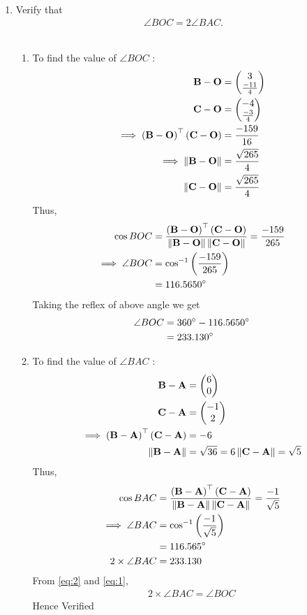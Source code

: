 \documentclass[11pt]{book}
\begin{document}
\begin{enumerate}[label=\thesection.\arabic*.,ref=\thesection.\theenumi]
\item Verify that 
\begin{align}
\angle BOC = 2\angle BAC.
\end{align}\\
 \solution
\begin{enumerate}
\item To find  the value of $\angle{BOC}$ :
\begin{align}
\mathbf{B}-\mathbf{O}
          &=\begin{pmatrix}3\\\frac{-11}{4}\end{pmatrix} \\
\mathbf{C}-\mathbf{O}
         & =\begin{pmatrix}-4\\\frac{-3}{4}\end{pmatrix}
	  \\
\implies \left(\mathbf{B}-\mathbf{O}\right)^{\top}\left(\mathbf{C}-\mathbf{O}\right)&=\frac{-159}{16}\\
	\implies \left\lVert\mathbf{B}-\mathbf{O}\right\rVert&= \frac{\sqrt{265}}{4} \\
	\left\lVert\mathbf{C}-\mathbf{O}\right\rVert &= \frac{\sqrt{265}}{4}
\end{align}
Thus,
\begin{align}
\cos{BOC}&=\frac{\left(\mathbf{B}-\mathbf{O}\right)^{\top}\left(\mathbf{C}-\mathbf{O}\right)}{\left\lVert\mathbf{B}-\mathbf{O}\right\rVert\left\lVert\mathbf{C}-\mathbf{O}\right\rVert}
=\frac{-159}{265}\\
\implies\angle{BOC}&=\cos^{-1}\left(\frac{-159}{265}\right)
\\
	&=116.5650\degree
\end{align}
Taking the reflex of above angle we get 
\begin{align}
    \angle{BOC}&=360\degree-116.5650\degree \\
    &= 233.130\degree
\end{align}
	\item To find  the value of $\angle{BAC}$ :
\begin{align}
\mathbf{B}-\mathbf{A}&=\begin{pmatrix}6\\0\end{pmatrix} \\
\mathbf{C}-\mathbf{A}&=\begin{pmatrix}-1\\2\end{pmatrix}
\\
\implies \left(\mathbf{B}-\mathbf{A}\right)^{\top}\left(\mathbf{C}-\mathbf{A}\right)&=-6
\\
	\left\lVert\mathbf{B}-\mathbf{A}\right\rVert&= \sqrt{36}= 6
	\left\lVert\mathbf{C}-\mathbf{A}\right\rVert= \sqrt{5}
\end{align}
Thus,
\begin{align}
\cos{BAC}&=\frac{\brak{\vec{B}-\vec{A}}^{\top}\brak{\vec{C}-\vec{A}}}{\norm{\vec{B}-\vec{A}}\norm{\vec{C}-\vec{A}}}
=\frac{-1}{\sqrt{5}}\\
\implies\angle{BAC}&=\cos^{-1}\brak{\frac{-1}{\sqrt{5}}}\\
&=116.565\degree \label{eq:2}  \\
2\times\angle{BAC} &= 233.130
\end{align}
From \eqref{eq:2} and \eqref{eq:1},
\begin{align}
2\times\angle{BAC}
= \angle{BOC}
\end{align}
Hence Verified
\end{enumerate}


\end{enumerate}
\end{document}

